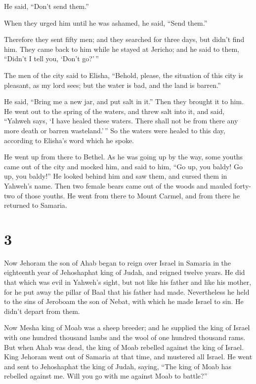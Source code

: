 He said, ``Don't send them.''

 When they urged him until he was ashamed, he said,
``Send them.''

Therefore they sent fifty men; and they searched for three days, but
didn't find him.  They came back to him while he stayed
at Jericho; and he said to them, ``Didn't I tell you, `Don't go?'\,''

 The men of the city said to Elisha, ``Behold, please,
the situation of this city is pleasant, as my lord sees; but the water
is bad, and the land is barren.''

 He said, ``Bring me a new jar, and put salt in it.''
Then they brought it to him.  He went out to the spring
of the waters, and threw salt into it, and said, ``Yahweh says, `I have
healed these waters. There shall not be from there any more death or
barren wasteland.'\,''  So the waters were healed to this
day, according to Elisha's word which he spoke.

 He went up from there to Bethel. As he was going up by
the way, some youths came out of the city and mocked him, and said to
him, ``Go up, you baldy! Go up, you baldy!''  He looked
behind him and saw them, and cursed them in Yahweh's name. Then two
female bears came out of the woods and mauled forty-two of those youths.
 He went from there to Mount Carmel, and from there he
returned to Samaria.

\hypertarget{section-2}{%
\section{3}\label{section-2}}

 Now Jehoram the son of Ahab began to reign over Israel in
Samaria in the eighteenth year of Jehoshaphat king of Judah, and reigned
twelve years.  He did that which was evil in Yahweh's
sight, but not like his father and like his mother, for he put away the
pillar of Baal that his father had made.  Nevertheless he
held to the sins of Jeroboam the son of Nebat, with which he made Israel
to sin. He didn't depart from them.

 Now Mesha king of Moab was a sheep breeder; and he
supplied the king of Israel with one hundred thousand lambs and the wool
of one hundred thousand rams.  But when Ahab was dead, the
king of Moab rebelled against the king of Israel.  King
Jehoram went out of Samaria at that time, and mustered all Israel.
 He went and sent to Jehoshaphat the king of Judah,
saying, ``The king of Moab has rebelled against me. Will you go with me
against Moab to battle?''


